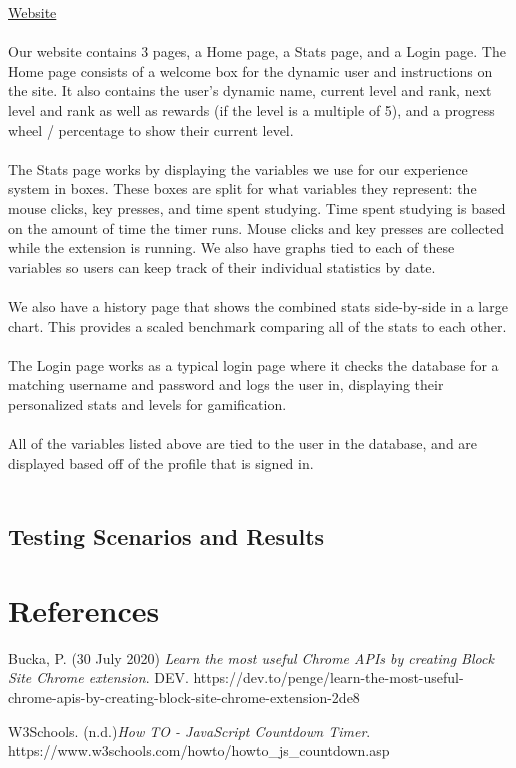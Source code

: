 \documentclass[12pt]{article}
\begin{document}
\noindent \underline{Website} \\\\\indent
Our website contains 3 pages, a Home page, a Stats page, and a Login page. The Home page consists of a welcome box for the dynamic user and instructions on the site. It also contains the user’s dynamic name, current level and rank, next level and rank as well as rewards (if the level is a multiple of 5), and a progress wheel / percentage to show their current level.
\\\\\indent The Stats page works by displaying the variables we use for our experience system in boxes. These boxes are split for what variables they represent: the mouse clicks, key presses, and time spent studying. Time spent studying is based on the amount of time the timer runs. Mouse clicks and key presses are collected while the extension is running. We also have graphs tied to each of these variables so users can keep track of their individual statistics by date.
\\\\\indent We also have a history page that shows the combined stats side-by-side in a large chart. This provides a scaled benchmark comparing all of the stats to each other.
\\\\\indent The Login page works as a typical login page where it checks the database for a matching username and password and logs the user in, displaying their personalized stats and levels for gamification.
\\\\\indent All of the variables listed above are tied to the user in the database, and are displayed based off of the profile that is signed in.
\\\\

\subsection{Testing Scenarios and Results}

\section{References}

\begingroup
\renewcommand{\section}[2]{}
\begin{thebibliography}{10}
    Bucka, P. (30 July 2020) \textit{Learn the most useful Chrome APIs by creating Block Site Chrome extension}.
    DEV. https://dev.to/penge/learn-the-most-useful-chrome-apis-by-creating-block-site-chrome-extension-2de8

    W3Schools. (n.d.)\textit{How TO - JavaScript Countdown Timer}. https://www.w3schools.com/howto/howto_js_countdown.asp

    \bigskip
\end{thebibliography}
\endgroup
\end{document}

